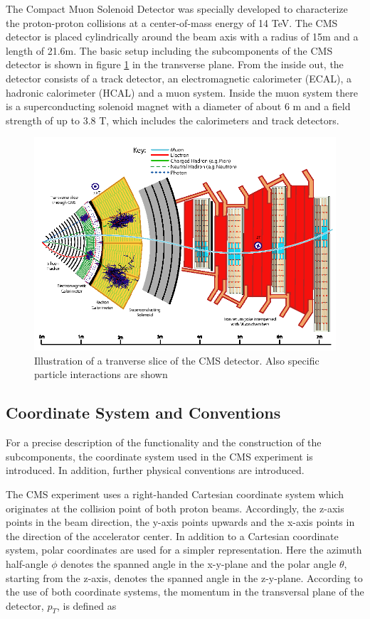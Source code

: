 \documentclass[12pt, a4paper]{thesis}
\begin{document}
The Compact Muon Solenoid Detector was specially developed to
characterize the proton-proton collisions at a center-of-mass energy
of 14 TeV. The CMS detector is placed cylindrically around the beam
axis with a radius of 15m and a length of 21.6m. The basic setup
including the subcomponents of the CMS detector is shown in figure
\ref{cms-detector} in the transverse plane.  From the inside out, the
detector consists of a track detector, an electromagnetic calorimeter
(ECAL), a hadronic calorimeter (HCAL) and a muon system.  Inside the
muon system there is a superconducting solenoid magnet with a diameter
of about 6 m and a field strength of up to 3.8 T, which includes the
calorimeters and track detectors.

\begin{figure}[hbtp]
  \centering
  \includegraphics[width=0.8 \textwidth]{../images/cms_detector.png}
  \caption{Illustration of a tranverse slice of the CMS detector. Also
    specific particle interactions are shown \cite{sirunyan17}}
  \label{cms-detector}
\end{figure}

\subsection{Coordinate System and Conventions} %
\label{sec:org067f254}

For a precise description of the functionality and the construction of
the subcomponents, the coordinate system used in the CMS experiment is
introduced. In addition, further physical conventions are introduced.

The CMS experiment uses a right-handed Cartesian coordinate system
which originates at the collision point of both proton
beams. Accordingly, the z-axis points in the beam direction, the
y-axis points upwards and the x-axis points in the direction of the
accelerator center. In addition to a Cartesian coordinate system,
polar coordinates are used for a simpler representation. Here the
azimuth half-angle \(\phi\) denotes the spanned angle in the x-y-plane
and the polar angle \(\theta\), starting from the z-axis, denotes the
spanned angle in the z-y-plane.  According to the use of both
coordinate systems, the momentum in the transversal plane of the
detector, \(p_T\), is defined as
\end{document}
